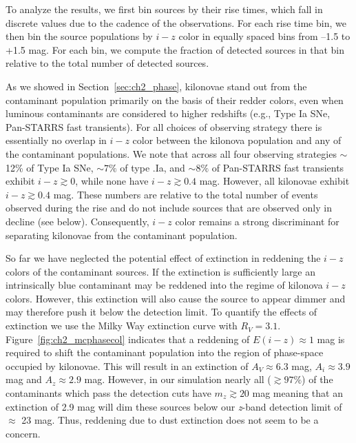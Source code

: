 To analyze the results, we first bin sources by their rise times, which fall in discrete values due to the cadence of the observations. For each rise time bin, we then bin the source populations by $i-z$ color in equally spaced bins from --1.5 to +1.5 mag. For each bin, we compute the fraction of detected sources in that bin relative to the total number of detected sources.

As we showed in Section~\ref{sec:ch2_phase}, kilonovae stand out from the contaminant population primarily on the basis of their redder colors, even when luminous contaminants are considered to higher redshifts (e.g., Type Ia SNe, Pan-STARRS fast transients). For all choices of observing strategy there is essentially no overlap in $i-z$ color between the kilonova population and any of the contaminant populations. We note that across all four observing strategies $\sim$12\% of Type Ia SNe, $\sim7\%$ of type .Ia, and $\sim8\%$ of Pan-STARRS fast transients exhibit $i-z\gtrsim 0$, while none have $i-z\gtrsim0.4$ mag. However, all kilonovae exhibit $i-z\gtrsim0.4$ mag. These numbers are relative to the total number of events observed during the rise and do not include sources that are observed only in decline (see below). Consequently, $i-z$ color remains a strong discriminant for separating kilonovae from the contaminant population.

So far we have neglected the potential effect of extinction in reddening the $i-z$ colors of the contaminant sources. If the extinction is sufficiently large an intrinsically blue contaminant may be reddened into the regime of kilonova $i-z$ colors. However, this extinction will also cause the source to appear dimmer and may therefore push it below the detection limit. To quantify the effects of extinction we use the Milky Way extinction curve with $R_V = 3.1$. Figure~\ref{fig:ch2_mcphasecol} indicates that a reddening of $E(i-z) \approx 1$ mag is required to shift the contaminant population into the region of phase-space occupied by kilonovae. This will result in an extinction of $A_V \approx 6.3$ mag, $A_i \approx 3.9$ mag and $A_z \approx 2.9$ mag.  However, in our simulation nearly all ($\gtrsim 97\%$) of the contaminants which pass the detection cuts have $m_z \gtrsim 20$ mag meaning that an extinction of 2.9 mag will dim these sources below our {\em z}-band detection limit of $\approx$ 23 mag. Thus, reddening due to dust extinction does not seem to be a concern.

